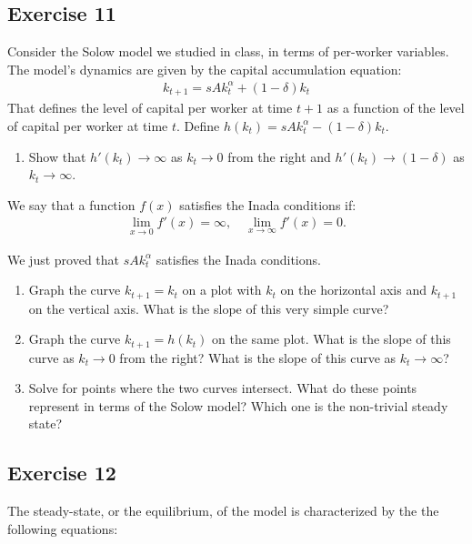 \documentclass[11pt]{article}
\begin{document}
\subsection*{Exercise 11}
Consider the Solow model we studied in class, in terms of 
per-worker variables.
The model's dynamics are given by the capital accumulation equation:
\begin{align*}
    k_{t+1} = sA k^{\alpha}_t + (1 - \delta) k_t
\end{align*}
That defines the level of capital per worker at time \( t+1 \) as a function of the
level of capital per worker at time \( t \).
Define \(h(k_t) = sAk_t^{\alpha} - (1 - \delta)k_t\).

\begin{enumerate}
    \item Show that \(h'(k_t) \to \infty\) as \(k_t \to 0\) from the right and \(h'(k_t) \to (1-\delta)\) as \(k_t \to \infty\).
\end{enumerate}

We say that a function \(f(x)\) satisfies the Inada conditions if:
\begin{align*}
    \lim_{x \to 0} f'(x) = \infty, \quad \lim_{x \to \infty} f'(x) = 0.
\end{align*}

We just proved that \(sAk_t^{\alpha} \) satisfies the Inada conditions.

\begin{enumerate}[resume]
    \item Graph the curve \(k_{t+1} = k_t\) on a plot with \(k_t\) on the horizontal axis and \(k_{t+1}\) on
    the vertical axis. What is the slope of this very simple curve?
    \item Graph the curve \(k_{t+1} = h(k_t)\) on the same plot. What is the slope of this curve 
    as \(k_t \to 0\) from the right? What is the slope of this curve as \(k_t \to \infty\)?
    \item Solve for points where the two curves intersect. 
    What do these points represent in terms of the Solow model? Which one is the 
    non-trivial steady state?
\end{enumerate}

\subsection*{Exercise 12}

The steady-state, or the equilibrium, of the model is characterized by the
the following equations:
\end{document}
